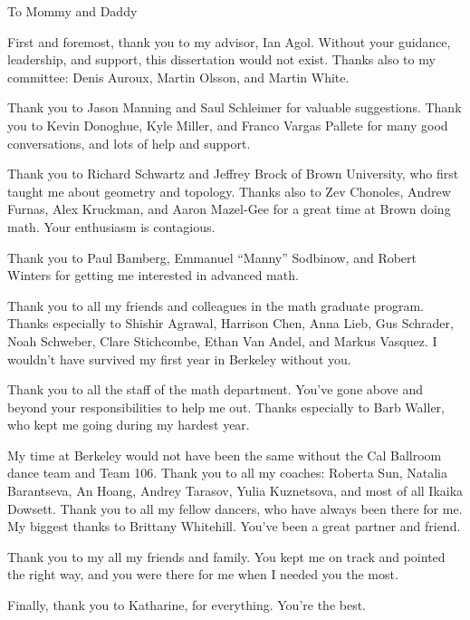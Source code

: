 \documentclass{ucbthesis}
\begin{document}
\begin{frontmatter}

\begin{dedication}
\null\vfil
\begin{center}

To Mommy and Daddy

\end{center} \vfil\null \end{dedication}


\tableofcontents
\clearpage
\listoffigures


\begin{acknowledgements}

First and foremost, thank you to my advisor, Ian Agol. Without your guidance,
leadership, and support, this dissertation would not exist. Thanks also to my
committee: Denis Auroux, Martin Olsson, and Martin White.

Thank you to Jason Manning and Saul Schleimer for valuable suggestions.  Thank
you to Kevin Donoghue, Kyle Miller, and Franco Vargas Pallete for many good
conversations, and lots of help and support.

Thank you to Richard Schwartz and Jeffrey Brock of Brown University, who first
taught me about geometry and topology. Thanks also to Zev Chonoles, Andrew
Furnas, Alex Kruckman, and Aaron Mazel-Gee for a great time at Brown doing
math. Your enthusiasm is contagious.

Thank you to Paul Bamberg, Emmanuel ``Manny'' Sodbinow, and Robert Winters for
getting me interested in advanced math.

Thank you to all my friends and colleagues in the math graduate program.
Thanks especially to Shishir Agrawal, Harrison Chen, Anna Lieb, Gus Schrader,
Noah Schweber, Clare Stichcombe, Ethan Van Andel, and Markus Vasquez.
I wouldn't have survived my first year in Berkeley without you.

Thank you to all the staff of the math department. You've gone above and beyond
your responsibilities to help me out. Thanks especially to Barb Waller, who
kept me going during my hardest year.

My time at Berkeley would not have been the same without the Cal Ballroom dance
team and Team 106. Thank you to all my coaches: Roberta Sun, Natalia
Barantseva, An Hoang, Andrey Tarasov, Yulia Kuznetsova, and most of all Ikaika
Dowsett.  Thank you to all my fellow dancers, who have always been there for
me.  My biggest thanks to Brittany Whitehill. You've been a great partner and
friend.

Thank you to my all my friends and family. You kept me on track and pointed the
right way, and you were there for me when I needed you the most.

Finally, thank you to Katharine, for everything. You're the best.

\end{acknowledgements}

\end{frontmatter}

\pagestyle{headings}









\end{document}
